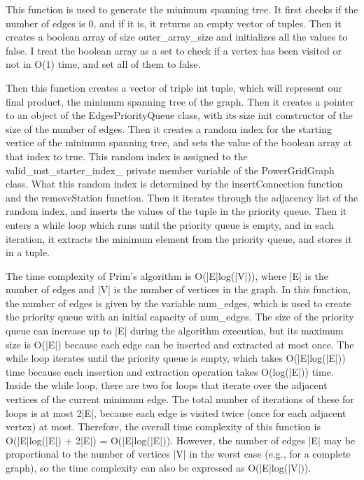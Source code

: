 			This function is used to generate the minimum spanning tree. It first checks if the number of edges is 0, and if it is, it returns an empty vector of tuples.
			Then it creates a boolean array of size {\color{draculapurple}outer\_array\_size} and initializes all the values to {\color{draculapurple}false}.
			I treat the boolean array as a set to check if a vertex has been visited or not in {\color{lightblue}O(1)} time, and set all of them to false.
			
			Then this function creates a vector of triple int tuple, which will represent our final product, the minimum spanning tree of the graph.
			Then it creates a pointer to an object of the {\color{draculapurple}EdgesPriorityQueue} class, with its size init constructor of the size of the number of edges.
			Then it creates a random index for the starting vertice of the minimum spanning tree, and sets the value of the boolean array at that index to {\color{draculapurple}true}.
			This random index is assigned to the {\color{Turquoise}valid\_mst\_starter\_index\_} private member variable of the {\color{draculapurple}PowerGridGraph} class.
			What this random index is determined by the {\color{draculapurple}insertConnection} function and the {\color{draculapurple}removeStation} function.
			Then it iterates through the adjacency list of the random index, and inserts the values of the tuple in the priority queue.
			Then it enters a while loop which runs until the priority queue is empty, and in each iteration, it extracts the minimum element from the priority queue, and stores it in a tuple.

			The time complexity of Prim's algorithm is {\color{lightblue}O(|E|log(|V|))}, where {\color{draculapurple}|E|} is the number of edges and 
			{\color{draculapurple}|V|} is the number of vertices in the graph.
			In this function, the number of edges is given by the variable {\color{draculapurple}num\_edges}, which is used to create the priority queue 
			with an initial capacity of {\color{draculapurple}num\_edges}. The size of the priority queue can increase up to {\color{draculapurple}|E|} 
			during the algorithm execution, but its maximum size is {\color{lightblue}O(|E|)} because each edge can be inserted and extracted at most once.
			The while loop iterates until the priority queue is empty, which takes {\color{lightblue}O(|E|log(|E|))} time because each insertion and 
			extraction operation takes {\color{lightblue}O(log(|E|))} time.
			Inside the while loop, there are two for loops that iterate over the adjacent vertices of the current minimum edge. The total number of 
			iterations of these for loops is at most {\color{draculapurple}2|E|}, because each edge is visited twice (once for each adjacent vertex) at most.
			Therefore, the overall time complexity of this function is {\color{lightblue}O(|E|log(|E|) + 2|E|) = O(|E|log(|E|))}.
			However, the number of edges {\color{draculapurple}|E|} may be proportional to the number of vertices {\color{draculapurple}|V|} in the worst
			 case (e.g., for a complete graph), so the time complexity can also be expressed as {\color{lightblue}O(|E|log(|V|))}.
			 
